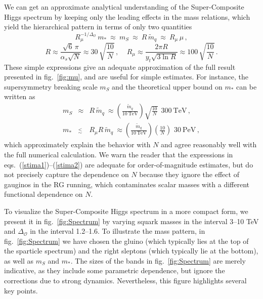 \documentclass[a4paper,12pt]{article}
\newcommand{\lsim}{\stackrel{<}{_\sim}}
\newcommand{\bea}{\begin{eqnarray}}
\newcommand{\eea}{\end{eqnarray}}
\newcommand{\beq}{\begin{equation}}
\newcommand{\eeq}{\end{equation}}
\def\fig#1{fig.~\ref{#1}}
\def\fig#1{fig.~\ref{#1}}
\def\O{\mathcal{O}}
\def\mst{m_*}
\def\mS{m_S}
\begin{document}
We can get an approximate analytical understanding of the Super-Composite Higgs spectrum by keeping only the leading effects in the mass relations, which yield the hierarchical pattern in terms of only two quantities
\beq
R_\mu^{-1/\Delta_\O}\, \mst ~\approx~ \mS ~\approx~ R\, {\tilde m}_q ~\approx~ R_\mu \, \mu \, ,
\label{stima1}
\eeq
\beq
R\approx \frac{\sqrt{6}\, \pi}{\alpha_s \sqrt{N}}\approx 30\, \sqrt{\frac{10}{N}} \,,~~~~~
R_\mu \approx \frac{2\pi R}{y_t\sqrt{3\ln R}} \approx 100\, \sqrt{\frac{10}{N}} \, .
\label{stima2}
\eeq
These simple expressions give an adequate approximation of the full result presented in \fig{fig:mu}, and are useful for simple estimates. For instance, the supersymmetry breaking scale $\mS$ and the theoretical upper bound on $\mst$ can be written as
\bea
\mS &\approx& R\, {\tilde m}_q ~\approx \left( \frac{{\tilde m}_q}{10~\textrm{TeV}}\right)
\sqrt{ \frac{10}{N}}~~ 300~\textrm{TeV} \, , \\
\mst &\lsim& R_\mu R\, {\tilde m}_q ~\approx \left( \frac{{\tilde m}_q}{10~\textrm{TeV}}\right)
\left( \frac{10}{N}\right)\,\, 30~\textrm{PeV} \, ,
\eea
which approximately explain the behavior with $N$ and agree reasonably well with the full numerical calculation. We warn the reader that the expressions in eqs.~(\ref{stima1})--(\ref{stima2}) are adequate for order-of-magnitude estimates, but do not precisely capture the dependence on $N$ because they ignore the effect of gauginos in the RG running, which contaminates scalar masses with a different functional dependence on $N$. 

To visualize the Super-Composite Higgs spectrum in a more compact form, we present it in \fig{fig:Spectrum} by varying squark masses 
 in the interval 3--10 TeV and $\Delta_\O$ in the interval 1.2--1.6. To illustrate the mass pattern, in \fig{fig:Spectrum} we have chosen the gluino (which typically lies at the top of the sparticle spectrum) and the right sleptons (which typically lie at the bottom), as well as $\mS$ and $\mst$. The sizes of the bands in \fig{fig:Spectrum} are merely indicative, as they include some parametric dependence, but ignore the corrections due to strong dynamics. Nevertheless, this figure highlights several key points.
\end{document}
